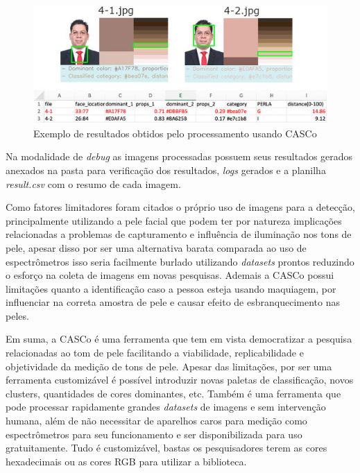 \begin{figure}[h!]
\caption{Exemplo de resultados obtidos pelo processamento usando CASCo}
\centering

\includegraphics[]{Template_Latex_TCC-UNIFTEC/_lib/imagens/casco.jpg}

\label{fig:x resultado_CASCo}
\end{figure}

Na modalidade de \textit{debug} as imagens processadas possuem seus resultados gerados anexados na pasta para verificação dos resultados, \textit{logs} gerados e a planilha \textit{result.csv} com o resumo de cada imagem.

Como fatores limitadores foram citados o próprio uso de imagens para a detecção, principalmente utilizando a pele facial que podem ter por natureza implicações relacionadas a problemas de capturamento e influência de iluminação nos tons de pele, apesar disso por ser uma alternativa barata comparada ao uso de espectrômetros isso seria facilmente burlado utilizando \textit{datasets} prontos reduzindo o esforço na coleta de imagens em novas pesquisas. Ademais a CASCo possui limitações quanto a identificação caso a pessoa esteja usando maquiagem, por influenciar na correta amostra de pele e causar efeito de esbranquecimento nas peles.

Em suma, a CASCo é uma ferramenta que tem em vista democratizar a pesquisa relacionadas ao tom de pele facilitando a viabilidade, replicabilidade e objetividade da medição de tons de pele. Apesar das limitações, por ser uma ferramenta customizável é possível introduzir novas paletas de classificação, novos clusters, quantidades de cores dominantes, etc. Também é uma ferramenta que pode processar rapidamente grandes \textit{datasets} de imagens e sem intervenção humana, além de não necessitar de aparelhos caros para medição como espectrômetros para seu funcionamento e ser disponibilizada para uso gratuitamente. Tudo é customizável, bastas os pesquisadores terem as cores hexadecimais ou as cores RGB para utilizar a biblioteca.




